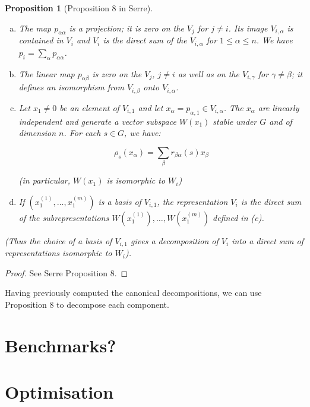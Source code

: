 \documentclass{article}
\newtheorem*{proposition}{Proposition}
\begin{document}
\begin{proposition}[Proposition 8 in Serre]\ \\
\vspace{-1em}
\begin{enumerate}[(a)]
  \item The map $p_{\alpha\alpha}$ is a projection; it is zero on the
    $V_j$ for $j \neq i$. Its image $V_{i,\alpha}$ is contained in
    $V_i$ and $V_i$ is the direct sum of the $V_{i,\alpha}$ for $1
    \leq \alpha \leq n$. We have $p_i = \sum_\alpha p_{\alpha\alpha}$.

  \item The linear map $p_{\alpha\beta}$ is zero on the $V_j$, $j \neq
    i$ as well as on the $V_{i,\gamma}$ for $\gamma \neq \beta$; it
    defines an isomorphism from $V_{i, \beta}$ onto $V_{i, \alpha}$.

  \item Let $x_1 \neq 0$ be an element of $V_{i,1}$ and let $x_\alpha
    = p_{\alpha,1} \in V_{i,\alpha}$. The $x_\alpha$ are linearly
    independent and generate a vector subspace $W(x_1)$ stable under
    $G$ and of dimension $n$. For each $s \in G$, we have:

    $$\rho_s(x_\alpha) = \sum_\beta r_{\beta\alpha}(s)x_\beta$$

    (in particular, $W(x_1)$ is isomorphic to $W_i$)

  \item If $(x_1^{(1)}, \ldots, x_1^{(m)})$ is a basis of $V_{i,1}$,
    the representation $V_i$ is the direct sum of the
    subrepresentations $W(x_1^{(1)}), \ldots, W(x_1^{(m)})$ defined in
    (c).
\end{enumerate}

(Thus the choice of a basis of $V_{i,1}$ gives a decomposition of
$V_i$ into a direct sum of representations isomorphic to $W_i$).
\end{proposition}

\begin{proof}
See Serre Proposition 8.
\end{proof}

Having previously computed the canonical decompositions, we can use
Proposition 8 to decompose each component.

\section{Benchmarks?}

\section{Optimisation}
\end{document}
